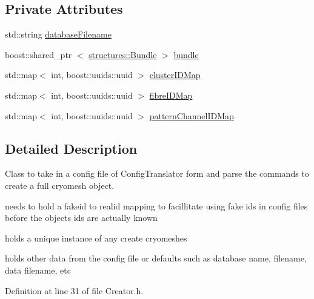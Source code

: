 \subsection*{\-Private \-Attributes}
\begin{DoxyCompactItemize}
\item 
std\-::string \hyperlink{classcryomesh_1_1manager_1_1Creator_a5d5c9a8aafa817c49c0787d0dae91a3a}{database\-Filename}
\item 
boost\-::shared\-\_\-ptr\*
$<$ \hyperlink{classcryomesh_1_1structures_1_1Bundle}{structures\-::\-Bundle} $>$ \hyperlink{classcryomesh_1_1manager_1_1Creator_ace9dd9da21fab7cf04f6681d332d40cc}{bundle}
\item 
std\-::map$<$ int, boost\-::uuids\-::uuid $>$ \hyperlink{classcryomesh_1_1manager_1_1Creator_a10123f4421b6231c863d86ebb219b545}{cluster\-I\-D\-Map}
\item 
std\-::map$<$ int, boost\-::uuids\-::uuid $>$ \hyperlink{classcryomesh_1_1manager_1_1Creator_aae2da58961bda370f9ec3498462a2411}{fibre\-I\-D\-Map}
\item 
std\-::map$<$ int, boost\-::uuids\-::uuid $>$ \hyperlink{classcryomesh_1_1manager_1_1Creator_a23dfcdd559d8bdbb1d03aac2587feb3a}{pattern\-Channel\-I\-D\-Map}
\end{DoxyCompactItemize}


\subsection{\-Detailed \-Description}
\-Class to take in a config file of \-Config\-Translator form and parse the commands to create a full cryomesh object. 


\begin{DoxyItemize}
\item needs to hold a fakeid to realid mapping to facillitate using fake ids in config files before the objects ids are actually known
\item holds a unique instance of any create cryomeshes
\item holds other data from the config file or defaults such as database name, filename, data filename, etc 
\end{DoxyItemize}

\-Definition at line 31 of file \-Creator.\-h.



